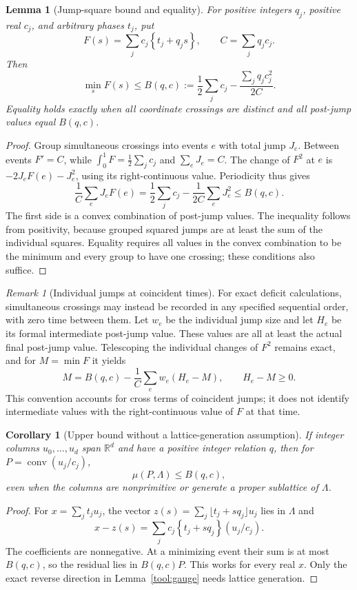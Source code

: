 \documentclass[11pt,a4paper]{article}
\newtheorem{lemma}[theorem]{Lemma}
\newtheorem{corollary}[theorem]{Corollary}
\theoremstyle{remark}\newtheorem{remark}[theorem]{Remark}
\DeclareMathOperator{\conv}{conv}
\newcommand{\R}{\mathbb R}\newcommand{\Z}{\mathbb Z}\newcommand{\Q}{\mathbb Q}
\newcommand{\fr}[1]{\left\{#1\right\}}\newcommand{\one}{\mathbf1}
\begin{document}
\begin{lemma}[Jump-square bound and equality]\label{tool:jump}
For positive integers $q_j$, positive real $c_j$, and arbitrary
phases $t_j$, put
\[
 F(s)=\sum_jc_j\fr{t_j+q_js},\qquad C=\sum_jq_jc_j.
\]
Then
\begin{equation}\label{tool:bound}
 \min_sF(s)\le B(q,c):=
 \frac12\sum_jc_j-\frac{\sum_jq_jc_j^2}{2C}.
\end{equation}
Equality holds exactly when all coordinate crossings are distinct
and all post-jump values equal $B(q,c)$.
\end{lemma}
\begin{proof}
Group simultaneous crossings into events $e$ with total jump $J_e$.
Between events $F'=C$, while
$\int_0^1F=\tfrac12\sum_jc_j$ and $\sum_eJ_e=C$.
The change of $F^2$ at $e$ is $-2J_eF(e)-J_e^2$, using its
right-continuous value. Periodicity thus gives
\[
 \frac1C\sum_eJ_eF(e)
 =\frac12\sum_jc_j-\frac1{2C}\sum_eJ_e^2
 \le B(q,c).
\]
The first side is a convex combination of post-jump values.
The inequality follows from positivity, because grouped squared
jumps are at least the sum of the individual squares.
Equality requires all values in the convex combination to be the
minimum and every group to have one crossing; these conditions
also suffice.
\end{proof}

\begin{remark}[Individual jumps at coincident times]\label{tool:individual}
For exact deficit calculations, simultaneous crossings may instead
be recorded in any specified sequential order, with zero time
between them. Let $w_e$ be the individual jump size and let $H_e$
be its formal intermediate post-jump value. These values are all
at least the actual final post-jump value. Telescoping the individual
changes of $F^2$ remains exact, and for $M=\min F$ it yields
\begin{equation}\label{tool:deficit}
 M=B(q,c)-\frac1C\sum_e w_e(H_e-M),\qquad H_e-M\ge0.
\end{equation}
This convention accounts for cross terms of coincident jumps; it
does not identify intermediate values with the right-continuous
value of $F$ at that time.
\end{remark}

\begin{corollary}[Upper bound without a lattice-generation assumption]
\label{tool:upper}
If integer columns $u_0,\ldots,u_d$ span $\R^d$ and have a positive
integer relation $q$, then for $P=\conv(u_j/c_j)$,
\[
 \mu(P,\Lambda)\le B(q,c),
\]
even when the columns are nonprimitive or generate a proper
sublattice of $\Lambda$.
\end{corollary}
\begin{proof}
For $x=\sum_jt_ju_j$, the vector
$z(s)=\sum_j\lfloor t_j+sq_j\rfloor u_j$ lies in $\Lambda$ and
\[
 x-z(s)=\sum_jc_j\fr{t_j+sq_j}(u_j/c_j).
\]
The coefficients are nonnegative. At a minimizing event their
sum is at most $B(q,c)$, so the residual lies in $B(q,c)P$.
This works for every real $x$. Only the exact reverse direction
in Lemma~\ref{tool:gauge} needs lattice generation.
\end{proof}
\end{document}
